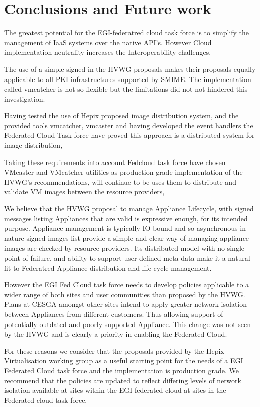 \documentclass{llncs_Ibergrid2013}
\begin{document}
\section{Conclusions and Future work}
\label{sect-conclusions}
The greatest potential for the EGI-federatred cloud task force is to simplify the management of IaaS systems over the native API's. However Cloud implementation neutrality increases the Interoperability challenges. 

The use of a simple signed in the HVWG proposals makes their proposals equally applicable to all PKI infrastructures supported by SMIME. The implementation called vmcatcher is not so flexible but the limitations did not not hindered this investigation.

Having tested the use of Hepix proposed image distribution system, and the provided tools vmcatcher, vmcaster and having developed the event handlers the Federated Cloud Task force have proved this approach is a distributed system for image distribution, 

Taking these requirements into account Fedcloud task force have chosen VMcaster and VMcatcher utilities as production grade implementation of the HVWG's recommendations, will continue to be uses them to distribute and validate VM images between the resource providers,

We believe that the HVWG proposal to manage Appliance Lifecycle, with signed messages listing Appliances that are valid is expressive enough, for its intended purpose. Appliance management is typically IO bound and so asynchronous in nature signed images list provide a simple and clear way of managing appliance images are checked by resource providers. Its distributed model with no single point of failure, and ability to support user defined meta data make it a natural fit to Federatred Appliance distribution and life cycle management.

However the EGI Fed Cloud task force needs to develop policies applicable to a wider range of both sites and user communities than proposed by the HVWG. Plans at CESGA amongst other sites intend to apply greater network isolation between Appliances from different customers. Thus allowing support of potentially outdated and poorly supported Appliance. This change was not seen by the HVWG and is clearly a priority in enabling the Federated Cloud.

For these reasons we consider that the proposals provided by the Hepix Virtualisation working group as a useful starting point for the needs of a EGI Federated Cloud task force and the implementation is production grade. We recommend that the policies are updated to reflect differing levels of network isolation available at sites within the EGI federated cloud at sites in the Federated cloud task force.
\end{document}
